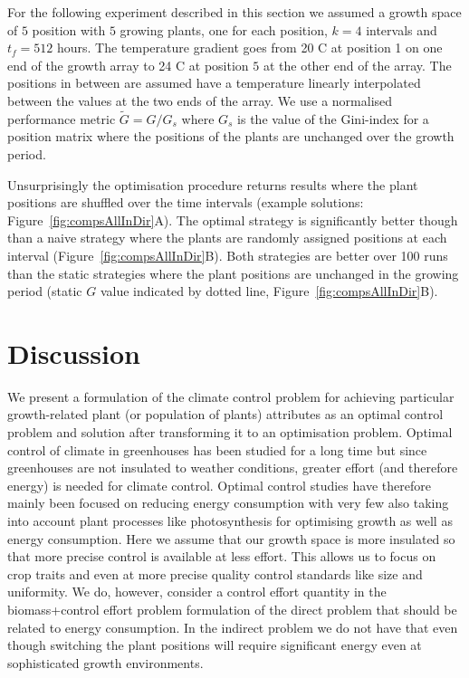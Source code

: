 For the following experiment described in this section we assumed a growth space
of $5$ position with $5$ growing plants, one for each position, $k=4$ intervals
and $t_f=512$ hours. The temperature gradient goes from 20 \textdegree C at
position 1 on one end of the growth array to 24 \textdegree C at position $5$ at
the other end of the array. The positions in between are assumed have a
temperature linearly interpolated between the values at the two ends of the
array. We use a normalised performance metric $\tilde{G}=G/G_s$ where $G_s$ is
the value of the Gini-index for a position matrix where the positions of the
plants are unchanged over the growth period.

Unsurprisingly the optimisation procedure returns results where the plant
positions are shuffled over the time intervals (example solutions:
Figure~\ref{fig:compsAllInDir}A). The optimal strategy is significantly better
though than a naive strategy where the plants are randomly assigned positions at
each interval (Figure~\ref{fig:compsAllInDir}B). Both strategies are better over
100 runs than the static strategies where the plant positions are unchanged in
the growing period (static $G$ value indicated by dotted line,
Figure~\ref{fig:compsAllInDir}B).


\section{Discussion}
We present a formulation of the climate control problem for achieving particular
growth-related plant (or population of plants) attributes as an optimal control
problem and solution after transforming it to an optimisation problem. Optimal
control of climate in greenhouses has been studied for a long time but since
greenhouses are not insulated to weather conditions, greater effort (and
therefore energy) is needed for climate control. Optimal control studies have
therefore mainly been focused on reducing energy consumption \citep{fisher1997,
ramirezArias2012, delSagrado2016} with very few also taking into account plant
processes like photosynthesis for optimising growth as well as energy
consumption\citep{harun2015, Aaslyng2003}. Here we assume that our growth space
is more insulated so that more precise control is available at less effort. This
allows us to focus on crop traits and even at more precise quality control
standards like size and uniformity. We do, however, consider a control effort
quantity in the biomass+control effort problem formulation of the direct problem
that should be related to energy consumption. In the indirect problem we do not
have that even though switching the plant positions will require significant
energy even at sophisticated growth environments.  %


